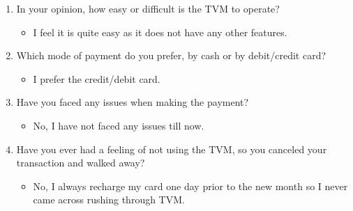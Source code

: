 \documentclass[15pt]{article}
\begin{document}
\begin{appendices}
\begin{enumerate}[leftmargin=3em, itemsep=0pt, parsep=0pt, , font=\Large\bfseries]
\begin{enumerate}[leftmargin=2em, itemsep=0pt, parsep=0pt, , font=\Large\bfseries]
\begin{itemize}
            \end{itemize}
            \vspace{0.2cm}
        \item {\Large In your opinion, how easy or difficult is the TVM to operate?}
        \vspace{0.1cm}
            \begin{itemize}
                \item {\Large I feel it is quite easy as it does not have any other features.}
            \end{itemize}
            \vspace{0.2cm}
        \item {\Large Which mode of payment do you prefer, by cash or by debit/credit card?}
            \begin{itemize}
                \item {\Large I prefer the credit/debit card.}
            \end{itemize}
            \vspace{0.2cm}
        \item {\Large Have you faced any issues when making the payment?}
        \vspace{0.1cm}
            \begin{itemize}
                \item {\Large No, I have not faced any issues till now.}
            \end{itemize}
            \vspace{0.2cm}
        \item {\Large Have you ever had a feeling of not using the TVM, so you canceled your transaction and walked away?}
        \vspace{0.1cm}
            \begin{itemize}
                \item {\Large No, I always recharge my card one day prior to the new month so I never came across rushing through TVM.}
            \end{itemize}
            \vspace{0.2cm}
    \end{enumerate}
    

\end{enumerate}
\end{appendices}
\end{document}
